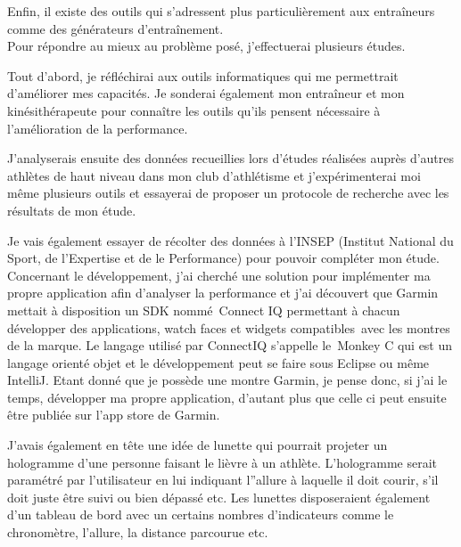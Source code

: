 Enfin, il existe des outils qui s'adressent plus particulièrement aux entraîneurs comme des générateurs d'entraînement. \\

Pour répondre au mieux au problème posé, j'effectuerai plusieurs études.

Tout d'abord, je réfléchirai aux outils informatiques qui me permettrait d'améliorer mes capacités. Je sonderai également mon entraîneur et mon kinésithérapeute pour connaître les outils qu'ils pensent nécessaire à l'amélioration de la performance.

J'analyserais ensuite des données recueillies lors d'études réalisées auprès d'autres athlètes de haut niveau dans mon club d’athlétisme et j'expérimenterai moi même plusieurs outils et essayerai de proposer un protocole de recherche avec les résultats de mon étude.

Je vais également essayer de récolter des données à l'INSEP (Institut National du Sport, de l'Expertise et de le Performance) pour pouvoir compléter mon étude.\\

Concernant le développement, j’ai cherché une solution pour implémenter ma propre application afin d'analyser la performance et j’ai découvert que Garmin mettait à disposition un SDK nommé Connect IQ permettant à chacun développer des applications, watch faces et widgets compatibles avec les montres de la marque. Le langage utilisé par ConnectIQ s’appelle le Monkey C qui est un langage orienté objet et le développement peut se faire sous Eclipse ou même IntelliJ.
Etant donné que je possède une montre Garmin, je pense donc, si j'ai le temps, développer ma propre application, d'autant plus que celle ci peut ensuite être publiée sur l'app store de Garmin.

J'avais également en tête une idée de lunette qui pourrait projeter un hologramme d'une personne faisant le lièvre à un athlète. L'hologramme serait paramétré par l'utilisateur en lui indiquant l''allure à laquelle il doit courir, s'il doit juste être suivi ou bien dépassé etc. Les lunettes disposeraient  également d'un tableau de bord avec un certains nombres d'indicateurs comme le chronomètre, l'allure, la distance parcourue etc.

